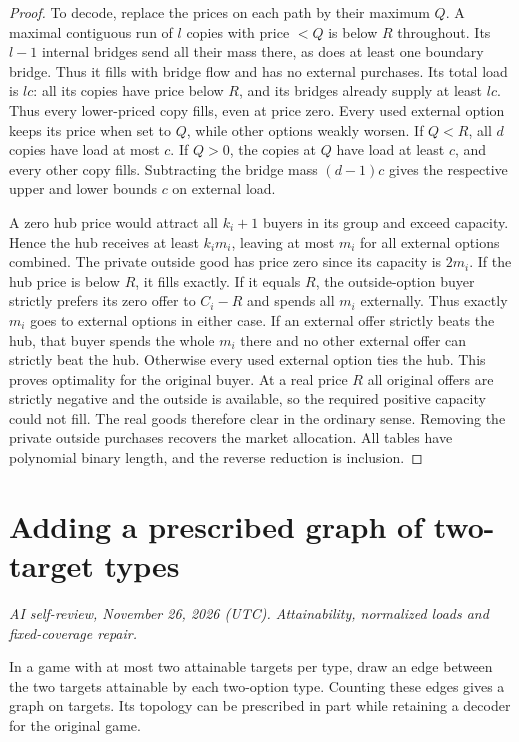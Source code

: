\documentclass[11pt,oneside,openany,notitlepage]{report}
\newcommand{\reviewdate}{November 26, 2026 (UTC)}
\newcommand{\reviewmark}[1]{\par\nopagebreak[4]\noindent
  {\footnotesize\itshape AI self-review, \reviewdate. #1\par}\nobreak\smallskip}
\begin{document}
\begin{proof}
To decode, replace the prices on each path by their maximum \(Q\). A
maximal contiguous run of \(l\) copies with price \(<Q\) is below \(R\)
throughout. Its \(l-1\) internal bridges send all their mass there, as
does at least one boundary bridge. Thus it fills with bridge flow and
has no external purchases. Its total load is \(lc\): all its copies have
price below \(R\), and its bridges already supply at least \(lc\).
Thus every lower-priced copy fills, even at price zero. Every used
external option keeps its price when set to \(Q\), while other options
weakly worsen. If \(Q<R\), all \(d\) copies have load at most \(c\).
If \(Q>0\), the copies at \(Q\) have load at least \(c\), and every
other copy fills. Subtracting the bridge mass \((d-1)c\) gives the
respective upper and lower bounds \(c\) on external load.

A zero hub price would attract all \(k_i+1\) buyers in its group and
exceed capacity. Hence the hub receives at least \(k_i m_i\), leaving
at most \(m_i\) for all external options combined. The private outside
good has price zero since its capacity is \(2m_i\). If the hub price is
below \(R\), it fills exactly. If it equals \(R\), the outside-option
buyer strictly prefers its zero offer to \(C_i-R\) and spends all \(m_i\)
externally. Thus exactly \(m_i\) goes to external options in either case.
If an external offer strictly beats the hub, that buyer spends the whole
\(m_i\) there and no other external offer can strictly beat the hub.
Otherwise every used external option ties the hub. This proves optimality
for the original buyer. At a real price \(R\) all original offers are
strictly negative and the outside is available, so the required positive
capacity could not fill. The real goods therefore clear in the ordinary
sense. Removing the private outside purchases recovers the market
allocation. All tables have polynomial binary length, and the reverse
reduction is inclusion.
\end{proof}

\section{Adding a prescribed graph of two-target types}\label{sec:overlay}
\reviewmark{Attainability, normalized loads and fixed-coverage repair.}

In a game with at most two attainable targets per type, draw an edge
between the two targets attainable by each two-option type. Counting
these edges gives a graph on targets. Its topology can be prescribed in
part while retaining a decoder for the original game.
\end{document}
